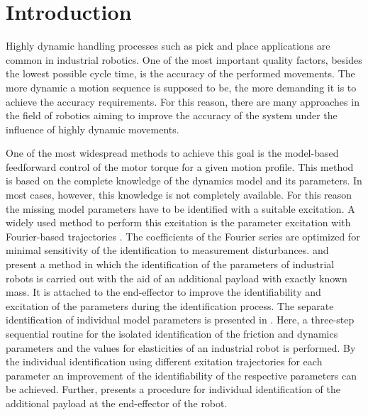 \section{Introduction}
\label{subsec:Introduction}

Highly dynamic handling processes such as pick and place applications are common in industrial robotics.
One of the most important quality factors, besides the lowest possible cycle time, is the accuracy of the performed movements. The more dynamic a motion sequence is supposed to be, the more demanding it is to achieve the accuracy requirements. For this reason, there are many approaches in the field of robotics aiming to improve the accuracy of the system under the influence of highly dynamic movements. 

One of the most widespread methods to achieve this goal is the model-based feedforward control of the motor torque for a given motion profile.
This method is based on the complete knowledge of the dynamics model and its parameters. 
In most cases, however, this knowledge is not completely available. 
For this reason the missing model parameters have to be identified with a suitable excitation. 
A widely used method to perform this excitation is the parameter excitation with Fourier-based trajectories \cite{Park.2006,Swevers.1997}.
The coefficients of the Fourier series are optimized for minimal sensitivity of the identification to measurement disturbances. 
\cite{Goutier.2012} and \cite{Goutier.2014} present a method in which the identification of the parameters of industrial robots is carried out with the aid of an additional payload with exactly known mass. 
It is attached to the end-effector to improve the identifiability and excitation of the parameters during the identification process.
The separate identification of individual model parameters is presented in \cite{Wernholt.2006}. 
Here, a three-step sequential routine for the isolated identification of the friction and dynamics parameters and the values for elasticities of an industrial robot is performed. By the individual identification using different exitation trajectories for each parameter an improvement of the identifiability of the respective parameters can be achieved.
Further, \cite{Khalil.2007} presents a procedure for individual identification of the additional payload at the end-effector of the robot.

